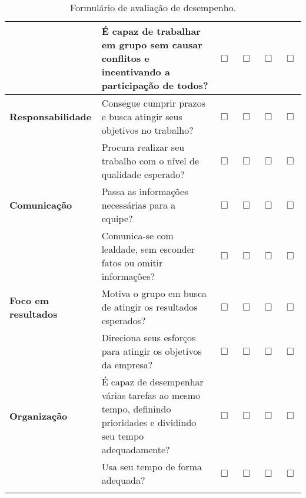 \begin{longtable}{ >{\bfseries}p{} p{} c c c c}
\cmidrule{2-6}
& É capaz de trabalhar em grupo sem causar conflitos e incentivando a participação de todos? & {\large$\Box$} & {\large$\Box$} & {\large$\Box$} & {\large$\Box$} \\
\midrule
Responsabilidade & Consegue cumprir prazos e busca atingir seus objetivos no trabalho? & {\large$\Box$} & {\large$\Box$} & {\large$\Box$} & {\large$\Box$} \\
\cmidrule{2-6}
& Procura realizar seu trabalho com o nível de qualidade esperado? & {\large$\Box$} & {\large$\Box$} & {\large$\Box$} & {\large$\Box$} \\
\midrule
Comunicação & Passa as informações necessárias para a equipe? & {\large$\Box$} & {\large$\Box$} & {\large$\Box$} & {\large$\Box$} \\
\cmidrule{2-6}
& Comunica-se com lealdade, sem esconder fatos ou omitir informações? & {\large$\Box$} & {\large$\Box$} & {\large$\Box$} & {\large$\Box$} \\
\midrule
Foco em resultados & Motiva o grupo em busca de atingir os resultados esperados? & {\large$\Box$} & {\large$\Box$} & {\large$\Box$} & {\large$\Box$} \\
\cmidrule{2-6}
& Direciona seus esforços para atingir os objetivos da empresa? & {\large$\Box$} & {\large$\Box$} & {\large$\Box$} & {\large$\Box$} \\
\midrule
Organização & É capaz de desempenhar várias tarefas ao mesmo tempo, definindo prioridades e dividindo seu tempo adequadamente? & {\large$\Box$} & {\large$\Box$} & {\large$\Box$} & {\large$\Box$} \\
\cmidrule{2-6}
& Usa seu tempo de forma adequada? & {\large$\Box$} & {\large$\Box$} & {\large$\Box$} & {\large$\Box$} \\
\bottomrule
\caption{Formulário de avaliação de desempenho.}
\centering
\end{longtable}

